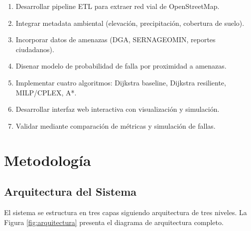 \documentclass[conference]{IEEEtran}
\begin{document}
\begin{enumerate}
    \item Desarrollar pipeline ETL para extraer red vial de OpenStreetMap.
    \item Integrar metadata ambiental (elevación, precipitación, cobertura de suelo).
    \item Incorporar datos de amenazas (DGA, SERNAGEOMIN, reportes ciudadanos).
    \item Disenar modelo de probabilidad de falla por proximidad a amenazas.
    \item Implementar cuatro algoritmos: Dijkstra baseline, Dijkstra resiliente, MILP/CPLEX, A*.
    \item Desarrollar interfaz web interactiva con visualización y simulación.
    \item Validar mediante comparación de métricas y simulación de fallas.
\end{enumerate}

\section{Metodología}

\subsection{Arquitectura del Sistema}

El sistema se estructura en tres capas siguiendo arquitectura de tres niveles. La Figura \ref{fig:arquitectura} presenta el diagrama de arquitectura completo.
\end{document}
